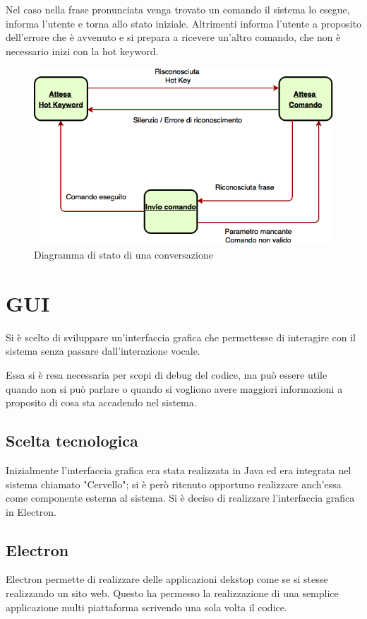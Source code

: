 \documentclass[twoside]{supsistudent}
\begin{document}
Nel caso nella frase pronunciata venga trovato un comando il sistema lo esegue, informa l'utente e torna allo stato iniziale.
Altrimenti informa l'utente a proposito dell'errore che è avvenuto e si prepara a ricevere un'altro comando, che non è necessario inizi con la hot keyword.
\begin{figure}[H]
\centering
\includegraphics[width=\textwidth]{Conversation}
\caption{Diagramma di stato di una conversazione}
\label{fig:pose}
\end{figure}
\chapter{GUI}
Si è scelto di sviluppare un'interfaccia grafica che permettesse di interagire con il sistema senza passare dall'interazione vocale.

Essa si è resa necessaria per scopi di debug del codice, ma può essere utile quando non si può parlare o quando si vogliono avere maggiori informazioni a proposito di cosa sta accadendo nel sistema.
\section{Scelta tecnologica}
Inizialmente l'interfaccia grafica era stata realizzata in Java ed era integrata nel sistema chiamato "Cervello"; si è però ritenuto opportuno realizzare anch'essa come componente esterna al sistema.
Si è deciso di realizzare l'interfaccia grafica in Electron. \cite{electron}
\section{Electron}
Electron permette di realizzare delle applicazioni dekstop come se si stesse realizzando un sito web. Questo ha permesso la realizzazione di una semplice applicazione multi piattaforma scrivendo una sola volta il codice.
\end{document}
